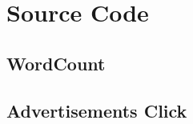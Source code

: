 \chapter{Source Code}
\label{chapter:appendix}
\begin{appendices}

\section{WordCount}
\section{Advertisements Click}

\end{appendices}

\clearpage


